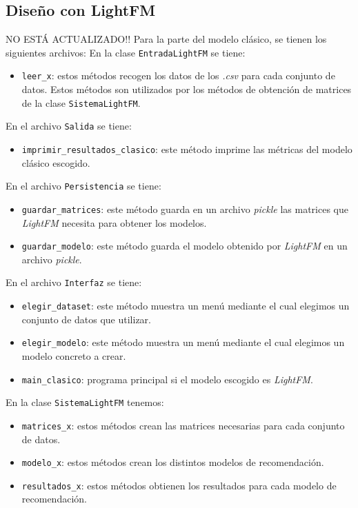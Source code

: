 \subsection{Diseño con LightFM}\label{diseño-lightfm}
NO ESTÁ ACTUALIZADO!!
Para la parte del modelo clásico, se tienen los siguientes archivos:
En la clase \texttt{EntradaLightFM} se tiene:
\begin{itemize}
\tightlist
\item \texttt{leer\_x}: estos métodos recogen los datos de los \textit{.csv} para cada conjunto de datos. Estos métodos son utilizados por los métodos de obtención de matrices de la clase \texttt{SistemaLightFM}.
\end{itemize}

En el archivo \texttt{Salida} se tiene:
\begin{itemize}
\tightlist
\item \texttt{imprimir\_resultados\_clasico}: este método imprime las métricas del modelo clásico escogido.
\end{itemize}

En el archivo \texttt{Persistencia} se tiene:
\begin{itemize}
\tightlist
\item \texttt{guardar\_matrices}: este método guarda en un archivo \textit{pickle} las matrices que \textit{LightFM} necesita para obtener los modelos.
\item \texttt{guardar\_modelo}: este método guarda el modelo obtenido por \textit{LightFM} en un archivo \textit{pickle}.
\end{itemize}

En el archivo \texttt{Interfaz} se tiene:
\begin{itemize}
\tightlist
\item \texttt{elegir\_dataset}: este método muestra un menú mediante el cual elegimos un conjunto de datos que utilizar.
\item \texttt{elegir\_modelo}: este método muestra un menú mediante el cual elegimos un modelo concreto a crear. 
\item \texttt{main\_clasico}: programa principal si el modelo escogido es \textit{LightFM}. 
\end{itemize}

En la clase \texttt{SistemaLightFM} tenemos:
\begin{itemize}
\tightlist
\item \texttt{matrices\_x}: estos métodos crean las matrices necesarias para cada conjunto de datos. 
\item \texttt{modelo\_x}: estos métodos crean los distintos modelos de recomendación. 
\item \texttt{resultados\_x}: estos métodos obtienen los resultados para cada modelo de recomendación. 
\end{itemize}

